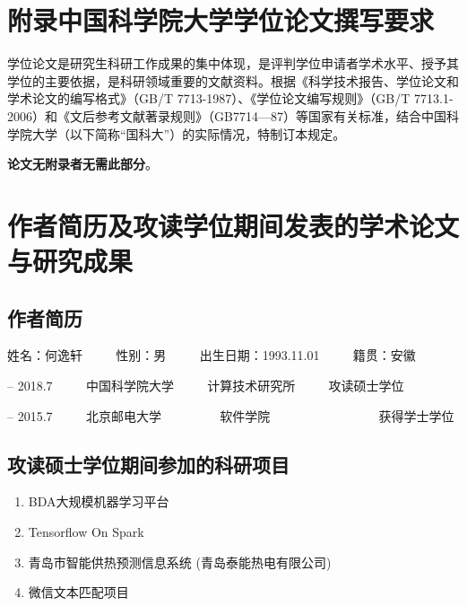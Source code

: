 \chapter[附录]{附录\quad 中国科学院大学学位论文撰写要求}%

学位论文是研究生科研工作成果的集中体现，是评判学位申请者学术水平、授予其学位的主要依据，是科研领域重要的文献资料。根据《科学技术报告、学位论文和学术论文的编写格式》（GB/T 7713-1987）、《学位论文编写规则》（GB/T 7713.1-2006）和《文后参考文献著录规则》（GB7714—87）等国家有关标准，结合中国科学院大学（以下简称“国科大”）的实际情况，特制订本规定。

\textbf{论文无附录者无需此部分}。

\chapter{作者简历及攻读学位期间发表的学术论文与研究成果}
\section*{作者简历}

\begin{center}
姓名：何逸轩 $\qquad$ 性别：男 $\qquad$ 出生日期：1993.11.01 $\qquad$ 籍贯：安徽\\
\end{center}

 -- 2018.7  $\qquad$  中国科学院大学 $\qquad$ 计算技术研究所 $\qquad$  攻读硕士学位

 -- 2015.7   $\qquad$ 北京邮电大学~~~~  $\qquad$ 软件学院~~~~~~~~~~~~ $\qquad$  获得学士学位

\section*{攻读硕士学位期间参加的科研项目} %
\begin{enumerate}
\item BDA大规模机器学习平台 \label{[1]}
\item Tensorflow On Spark \label{[1]}
\item 青岛市智能供热预测信息系统 (青岛泰能热电有限公司) \label{[1]}
\item 微信文本匹配项目 \label{[1]}
\end{enumerate}

